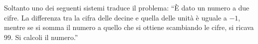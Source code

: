 Soltanto uno dei seguenti sistemi traduce il problema: 
“È dato un numero a due cifre. La differenza tra la cifra 
delle decine e quella delle unità è uguale a $-1$, mentre se si somma 
il numero a quello che si ottiene scambiando le cifre, 
si ricava $99$. Si calcoli il numero.”
